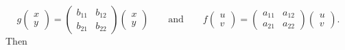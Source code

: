 \documentclass{article}
\begin{document}
$$
g\begin{pmatrix} x\\ y \end{pmatrix} =
\begin{pmatrix}
  b_{11} & b_{12} \\
  b_{21} & b_{22}
\end{pmatrix}
\begin{pmatrix}
  x \\ y
\end{pmatrix}\qquad
\text{and}
\qquad
f\begin{pmatrix} u\\ v \end{pmatrix} =
\begin{pmatrix}
  a_{11} & a_{12} \\
  a_{21} & a_{22}
\end{pmatrix}
\begin{pmatrix}
  u \\ v
\end{pmatrix}.
$$
Then
\end{document}
